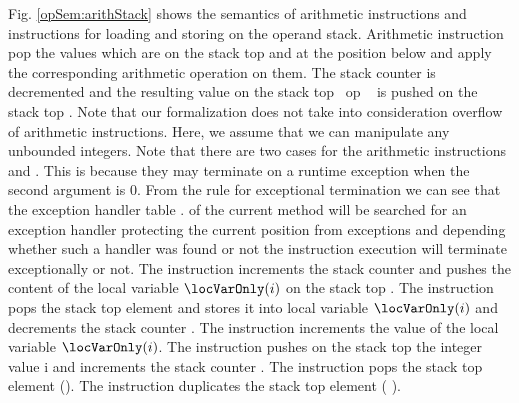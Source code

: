 Fig. \ref{opSem:arithStack}  shows the semantics of  arithmetic instructions and instructions for loading and storing on the operand stack. 
Arithmetic instruction pop the values which are on the stack top \stackOnlyParam{\counterOnly}  and   at the position below
 and apply the corresponding arithmetic operation on them.
 The stack counter is decremented and  the resulting  value on the stack top  \ \rm{op} \ \stackOnlyParam{\counterOnly}
 is pushed on the stack  top  . Note that our formalization does not take into consideration overflow of arithmetic instructions.
Here, we assume that we can manipulate any unbounded integers.  
Note that there are two cases for the arithmetic instructions   and . This is because they 
may terminate on a runtime exception when the second argument is 0. From the rule for exceptional termination
 we can see that the exception handler table \methodd.\excHandlerTable{} of the current method will be searched 
for an exception handler protecting the current position \pc{} from \ArithExc{} exceptions and depending whether such a handler was
found or not the instruction execution will terminate exceptionally or not. 
  The instruction \load{} increments the stack counter  \counterOnly and pushes
 the content of the local variable $\locVarOnly(i)$ on the stack top .  
The instruction \store{} pops the stack top element \stackOnlyParam{\counterOnly}  and stores it into
 local variable $\locVarOnly(i)$ and  decrements the stack counter \counterOnly.  
The instruction \iinc{} increments the value of the local variable $\locVarOnly(i)$.   
The instruction  \push{} pushes on the stack top the integer value \textrm{i}
 and increments the stack counter \counterOnly{}. The instruction \pop{} pops the stack top element
 \stackOnly(\counterOnly). The instruction \dup{} duplicates the stack top element  \stackOnly( \counterOnly ).  


